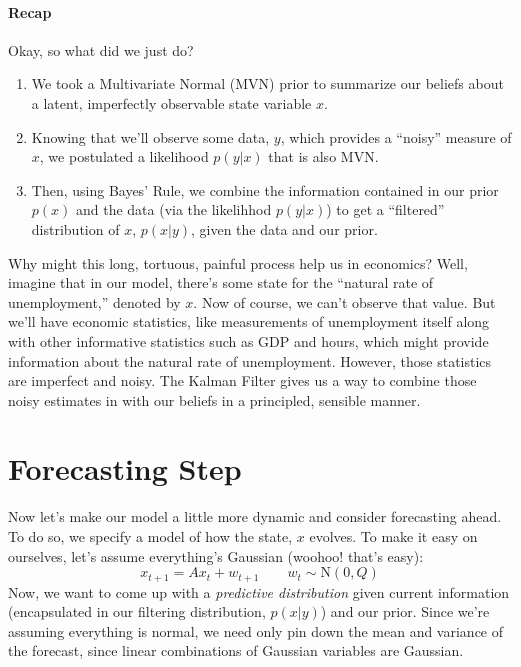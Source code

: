 \documentclass[a4paper,12pt]{article}
\begin{document}
\newpage
\paragraph{Recap} Okay, so what did we just do? 
\begin{enumerate} 
    \item We took a Multivariate Normal (MVN) prior to 
	summarize our beliefs about a latent, imperfectly 
    observable state variable $x$. 
    \item Knowing that we'll observe some data, $y$, which
	provides a ``noisy'' measure of $x$, we postulated a 
	likelihood $p(y|x)$ that is also MVN. 
    \item Then, using Bayes' Rule, we combine the information
	contained in our prior $p(x)$ and the data (via
	the likelihhod $p(y|x)$) to get a ``filtered'' 
	distribution of $x$, $p(x|y)$, given the data and our
	prior.
\end{enumerate} 
Why might this long, tortuous, painful process help us in
economics?  Well, imagine that in our model, there's some 
state for the ``natural rate of unemployment,'' denoted by $x$.  
Now of course, we can't observe that value.  But we'll have
economic statistics, like measurements of unemployment itself along 
with other informative statistics such as GDP
and hours, which might provide information about the natural
rate of unemployment.
However, those statistics are imperfect and noisy.  The
Kalman Filter gives us a way to combine those noisy estimates
in with our beliefs in a principled, sensible manner.


\section{Forecasting Step}

Now let's make our model a little more dynamic and consider 
forecasting ahead. To do so, we specify a model
of how the state, $x$ evolves.  To make it easy on ourselves,
let's assume everything's Gaussian (woohoo! that's easy):
\begin{equation}
    x_{t+1} = Ax_t + w_{t+1} \qquad w_t \sim \text{N}(0, Q)
\end{equation}
Now, we want to come up with a \emph{predictive distribution}
given current information (encapsulated in our filtering 
distribution, $p(x|y)$) and our prior. Since we're assuming
everything is normal, we need only pin down the
mean and variance of the forecast, since linear combinations
of Gaussian variables are Gaussian.  
\end{document}
